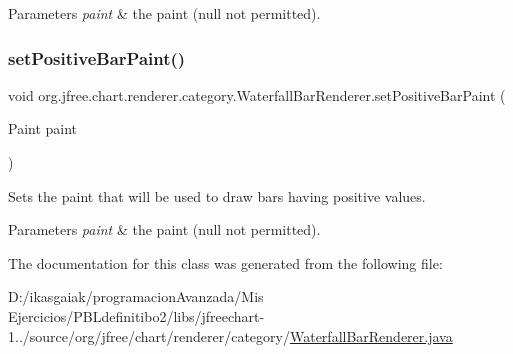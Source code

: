 \begin{DoxyParams}{Parameters}
{\em paint} & the paint ({\ttfamily null} not permitted). \\
\hline
\end{DoxyParams}
\mbox{\label{classorg_1_1jfree_1_1chart_1_1renderer_1_1category_1_1_waterfall_bar_renderer_ae4e4121c71b397c72aa248be0c949c78}} 
\subsubsection{\texorpdfstring{set\+Positive\+Bar\+Paint()}{setPositiveBarPaint()}}
{\footnotesize\ttfamily void org.\+jfree.\+chart.\+renderer.\+category.\+Waterfall\+Bar\+Renderer.\+set\+Positive\+Bar\+Paint (\begin{DoxyParamCaption}\item[{Paint}]{paint }\end{DoxyParamCaption})}

Sets the paint that will be used to draw bars having positive values.


\begin{DoxyParams}{Parameters}
{\em paint} & the paint ({\ttfamily null} not permitted). \\
\hline
\end{DoxyParams}


The documentation for this class was generated from the following file\+:\begin{DoxyCompactItemize}
\item 
D\+:/ikasgaiak/programacion\+Avanzada/\+Mis Ejercicios/\+P\+B\+Ldefinitibo2/libs/jfreechart-\/1../source/org/jfree/chart/renderer/category/\mbox{\hyperlink{_waterfall_bar_renderer_8java}{Waterfall\+Bar\+Renderer.\+java}}\end{DoxyCompactItemize}
